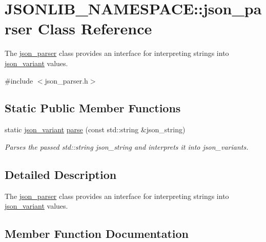 \hypertarget{classJSONLIB__NAMESPACE_1_1json__parser}{}\section{J\+S\+O\+N\+L\+I\+B\+\_\+\+N\+A\+M\+E\+S\+P\+A\+CE\+:\+:json\+\_\+parser Class Reference}
\label{classJSONLIB__NAMESPACE_1_1json__parser}


The \hyperlink{classJSONLIB__NAMESPACE_1_1json__parser}{json\+\_\+parser} class provides an interface for interpreting strings into \hyperlink{classJSONLIB__NAMESPACE_1_1json__variant}{json\+\_\+variant} values.  




{\ttfamily \#include $<$json\+\_\+parser.\+h$>$}

\subsection*{Static Public Member Functions}
\begin{DoxyCompactItemize}
\item 
static \hyperlink{classJSONLIB__NAMESPACE_1_1json__variant}{json\+\_\+variant} \hyperlink{classJSONLIB__NAMESPACE_1_1json__parser_a8f097c29f98ed795a92b5941c9070f8b}{parse} (const std\+::string \&json\+\_\+string)
\begin{DoxyCompactList}\small\item\em Parses the passed std\+::string {\ttfamily json\+\_\+string} and interprets it into json\+\_\+variants. \end{DoxyCompactList}\end{DoxyCompactItemize}


\subsection{Detailed Description}
The \hyperlink{classJSONLIB__NAMESPACE_1_1json__parser}{json\+\_\+parser} class provides an interface for interpreting strings into \hyperlink{classJSONLIB__NAMESPACE_1_1json__variant}{json\+\_\+variant} values. 

\subsection{Member Function Documentation}
\mbox{\label{classJSONLIB__NAMESPACE_1_1json__parser_a8f097c29f98ed795a92b5941c9070f8b}} 
